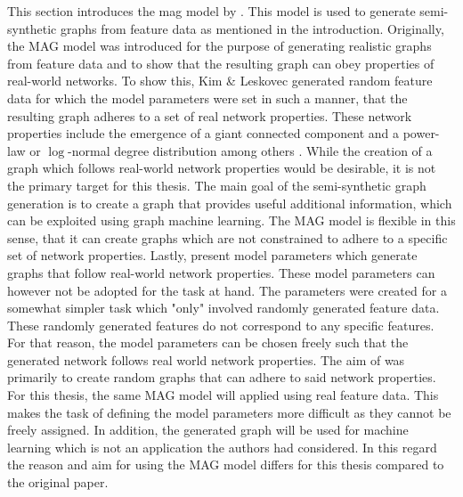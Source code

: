 	This section introduces the \acl{mag} model by \cite{kim2012multiplicative}. 
	This model is used to generate semi-synthetic graphs from feature data as 
	mentioned in the introduction. Originally, the MAG model was introduced for 
	the purpose of generating realistic graphs from feature data and to show that 
	the resulting graph can obey properties of real-world networks. To show this, 
	Kim \& Leskovec generated random feature data for which the model parameters 
	were set in such a manner, that the resulting graph adheres to a set of real 
	network properties. These network properties include the emergence of a giant
	connected component and a power-law or $\log$-normal degree distribution
	among others \citep[p. 113]{kim2012multiplicative}. While the creation of a 
	graph which follows real-world network properties would be desirable, it is 
	not the primary target for this thesis. The main goal of the semi-synthetic 
	graph generation is to create a graph that provides useful additional 
	information, which can be exploited using graph machine learning. The MAG 
	model is flexible in this sense, that it can create graphs which are not 
	constrained to adhere to a specific set of network properties. Lastly, 
	\citeauthor{kim2012multiplicative} 
	\citeyearpar[p. 138-139]{kim2012multiplicative} present model parameters 
	which generate graphs that follow real-world network properties. These model 
	parameters can however not be adopted for the task at hand. The parameters 
	were created for a somewhat simpler task which "only" involved randomly 
	generated feature data. These randomly generated features do not correspond
	to any specific features. For that reason, the model parameters can be
	chosen freely such that the generated network follows real world network
	properties. The aim of \citeauthor{kim2012multiplicative} was primarily to
	create random graphs that can adhere to said network properties. For this
	thesis, the same MAG model will applied using real feature data. This makes
	the task of defining the model parameters more difficult as they cannot be
	freely assigned. In addition, the generated graph will be used for machine
	learning which is not an application the authors had considered. In this 
	regard the reason and aim for using the MAG model differs for this thesis 
	compared to the original paper. \\

